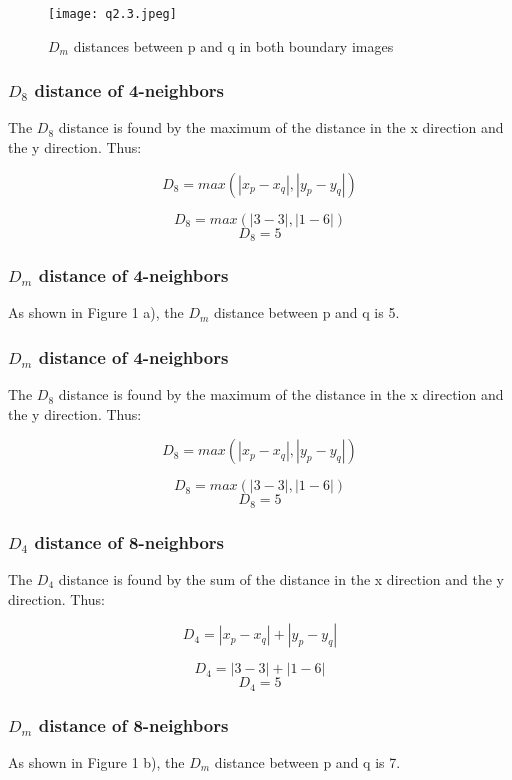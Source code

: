 \documentclass[12pt, letterpaper]{article}
\begin{document}

\begin{figure}[H]
    \centering
    \texttt{[image: q2.3.jpeg]}
    \caption{$D_m$ distances between p and q in both boundary images}
\end{figure}

\subsubsection{$D_8$ distance of 4-neighbors}

The $D_8$ distance is found by the maximum of the distance in the x direction and the y direction. Thus:

\[ D_8 = max(|x_p-x_q|, |y_p-y_q|) \]

\[ D_8 = max(|3-3|, |1-6|) \]
\[ D_8 = 5 \]

\subsubsection{$D_m$ distance of 4-neighbors}
As shown in Figure 1 a), the $D_m$ distance between p and q is 5.

\subsubsection{$D_m$ distance of 4-neighbors}

The $D_8$ distance is found by the maximum of the distance in the x direction and the y direction. Thus:

\[ D_8 = max(|x_p-x_q|, |y_p-y_q|) \]

\[ D_8 = max(|3-3|, |1-6|) \]
\[ D_8 = 5 \]

\subsubsection{$D_4$ distance of 8-neighbors}

The $D_4$ distance is found by the sum of the distance in the x direction and the y direction. Thus:

\[ D_4 = |x_p-x_q| + |y_p-y_q| \]

\[ D_4 = |3-3| + |1-6| \]
\[ D_4 = 5 \]

\subsubsection{$D_m$ distance of 8-neighbors}
As shown in Figure 1 b), the $D_m$ distance between p and q is 7.
\end{document}
